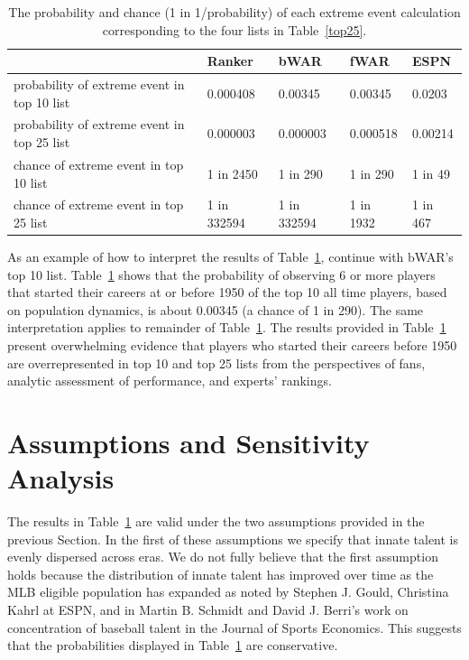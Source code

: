 \documentclass[11pt]{article}\usepackage[]{graphicx}\usepackage[]{color}
\begin{document}
\begin{table}[h!]
\begin{center}
\begin{tabular}{lllll}
\hline
  &  Ranker  &  bWAR  &  fWAR  &  ESPN \\
  \hline
probability of extreme event in top 10 list 
  & 0.000408 
  & 0.00345 
  & 0.00345 
  & 0.0203 \\
probability of extreme event in top 25 list 
  & 0.000003 
  & 0.000003 
  & 0.000518 
  & 0.00214 \\
chance of extreme event in top 10 list 
  & 1 in 2450 
  & 1 in 290 
  & 1 in 290 
  & 1 in 49 \\
chance of extreme event in top 25 list 
  & 1 in 332594 
  & 1 in 332594 
  & 1 in 1932 
  & 1 in 467 \\
  \hline
\end{tabular}
\end{center}
\caption{The probability and chance (1 in 1/probability) of each extreme event 
  calculation corresponding to the four lists in Table~\ref{top25}.}
\label{probvalues}
\end{table}

As an example of how to interpret the results of Table~\ref{probvalues}, 
continue with bWAR's top 10 list.  Table~\ref{probvalues} shows that the 
probability of observing 6 or more players that started their careers at 
or before 1950 of the top 10 all time players, based on population 
dynamics, is about 0.00345 
(a chance of 1 in 290).
The same interpretation applies to remainder of Table~\ref{probvalues}.  
The results provided in Table~\ref{probvalues} present overwhelming evidence 
that players who started their careers before 1950 are overrepresented in top 
10 and top 25 lists from the perspectives of fans, analytic assessment of 
performance, and experts' rankings.  



\section{Assumptions and Sensitivity Analysis}
\label{sec:Assumptions}

The results in Table~\ref{probvalues} are valid 
under the two assumptions provided in the previous Section.  In the first of 
these assumptions we specify that innate talent is evenly dispersed across 
eras. 
We do not fully believe that the first assumption holds because the 
distribution of innate talent has improved over time as the MLB eligible  
population has expanded as noted by Stephen J. Gould,  
Christina Kahrl at ESPN, and in 
Martin B. Schmidt and David J. Berri's work on concentration of baseball 
talent in the Journal of Sports Economics.
This suggests that the probabilities displayed in Table~\ref{probvalues} are 
conservative.  %
\end{document}
